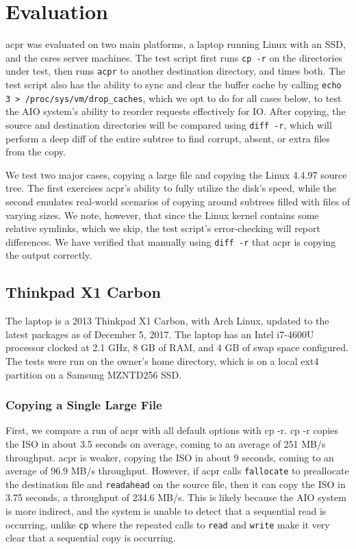 \documentclass[11pt]{article}
\begin{document}
\section{Evaluation}
acpr was evaluated on two main platforms, a laptop running Linux with an SSD, and the csres server machines. The test script first runs \texttt{cp -r} on the directories under test, then runs \texttt{acpr} to another destination directory, and times both. The test script also has the ability to sync and clear the buffer cache by calling \texttt{echo 3 > /proc/sys/vm/drop\_caches}, which we opt to do for all cases below, to test the AIO system's ability to reorder requests effectively for IO. After copying, the source and destination directories will be compared using \texttt{diff -r}, which will perform a deep diff of the entire subtree to find corrupt, absent, or extra files from the copy.

We test two major cases, copying a large file and copying the Linux 4.4.97 source tree. The first exercises acpr's ability to fully utilize the disk's speed, while the second emulates real-world scenarios of copying around subtrees filled with files of varying sizes. We note, however, that since the Linux kernel contains some relative symlinks, which we skip, the test script's error-checking will report differences. We have verified that manually using \texttt{diff -r} that acpr is copying the output correctly. 

\subsection{Thinkpad X1 Carbon}
The laptop is a 2013 Thinkpad X1 Carbon, with Arch Linux, updated to the latest packages as of December 5, 2017. The laptop has an Intel i7-4600U processor clocked at 2.1 GHz, 8 GB of RAM, and 4 GB of swap space configured. The tests were run on the owner's home directory, which is on a local ext4 partition on a Samsung MZNTD256 SSD.

\subsubsection{Copying a Single Large File}
First, we compare a run of acpr with all default options with cp -r. cp -r copies the ISO in about 3.5 seconds on average, coming to an average of 251 MB/s throughput. acpr is weaker, copying the ISO in about 9 seconds, coming to an average of 96.9 MB/s throughput. However, if acpr calls \texttt{fallocate} to preallocate the destination file and \texttt{readahead} on the source file, then it can copy the ISO in 3.75 seconds, a throughput of 234.6 MB/s. This is likely because the AIO system is more indirect, and the system is unable to detect that a sequential read is occurring, unlike \texttt{cp} where the repeated calls to \texttt{read} and \texttt{write} make it very clear that a sequential copy is occurring.
\end{document}
